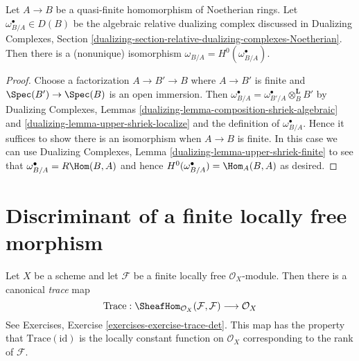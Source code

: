 \begin{lemma}
\label{lemma-compare-dualizing-algebraic}
Let $A \to B$ be a quasi-finite homomorphism of Noetherian rings.
Let $\omega_{B/A}^\bullet \in D(B)$ be the algebraic relative dualizing
complex discussed in Dualizing Complexes, Section
\ref{dualizing-section-relative-dualizing-complexes-Noetherian}.
Then there is a (nonunique) isomorphism
$\omega_{B/A} = H^0(\omega_{B/A}^\bullet)$.
\end{lemma}

\begin{proof}
Choose a factorization $A \to B' \to B$
where $A \to B'$ is finite and $\Spec(B') \to \Spec(B)$
is an open immersion. Then
$\omega_{B/A}^\bullet = \omega_{B'/A}^\bullet \otimes_B^\mathbf{L} B'$
by Dualizing Complexes, Lemmas
\ref{dualizing-lemma-composition-shriek-algebraic} and
\ref{dualizing-lemma-upper-shriek-localize} and
the definition of $\omega_{B/A}^\bullet$. Hence
it suffices to show there is an isomorphism when $A \to B$ is finite.
In this case we can use
Dualizing Complexes, Lemma \ref{dualizing-lemma-upper-shriek-finite}
to see that $\omega_{B/A}^\bullet = R\Hom(B, A)$ and hence
$H^0(\omega^\bullet_{B/A}) = \Hom_A(B, A)$ as desired.
\end{proof}






\section{Discriminant of a finite locally free morphism}
\label{section-discriminant}

\noindent
Let $X$ be a scheme and let $\mathcal{F}$ be a finite locally
free $\mathcal{O}_X$-module. Then there is a canonical {\it trace} map
$$
\text{Trace} :
\SheafHom_{\mathcal{O}_X}(\mathcal{F}, \mathcal{F})
\longrightarrow
\mathcal{O}_X
$$
See Exercises, Exercise \ref{exercises-exercise-trace-det}. This map has
the property that $\text{Trace}(\text{id})$ is the locally constant function
on $\mathcal{O}_X$ corresponding to the rank of $\mathcal{F}$.

